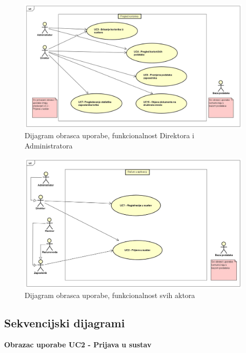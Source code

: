 					\begin{figure}[H]
						\includegraphics[width=\textwidth]{slike/3.1.1 dijagrami/PregledKorisnika.PNG}
						\caption{Dijagram obrasca uporabe, funkcionalnost Direktora i Administratora}
						\label{Obrazac3} 
					\end{figure}
					
					\begin{figure}[H]
						\includegraphics[width=\textwidth]{slike/3.1.1 dijagrami/RačuniUAplikaciji.PNG}
						\caption{Dijagram obrasca uporabe, funkcionalnost svih aktora}
						\label{Obrazac4} 
					\end{figure}
					
				\eject		
				
			\subsection{Sekvencijski dijagrami}
				
				\textbf{Obrazac uporabe UC2 - Prijava u sustav}\
				
